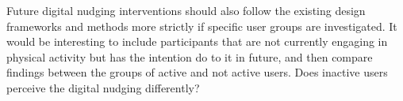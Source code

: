 Future digital nudging interventions should also follow the existing design frameworks and methods more strictly if specific user groups are investigated. It would be interesting to include participants that are not currently engaging in physical activity but has the intention do to it in future, and then compare findings between the groups of active and not active users. Does inactive users perceive the digital nudging differently?



 



